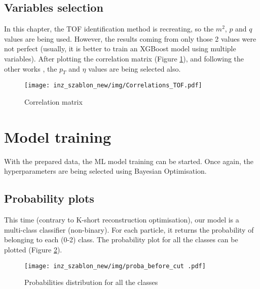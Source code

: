 \subsection{Variables selection}
In this chapter, the TOF identification method is recreating, so the $m^2$, $p$ and $q$ values are being used. However, the results coming from only those 2 values were not perfect (usually, it is better to train an XGBoost model using multiple variables). After plotting the correlation matrix (Figure \ref{cmatrix tof}), and following the other works \cite{ostrowski}, the $p_T$ and $\eta$ values are being selected also. 

\begin{figure}[h!]
    \centering
    \texttt{[image: inz\_szablon\_new/img/Correlations\_TOF.pdf]}
    \caption{Correlation matrix}
    \label{cmatrix tof}
\end{figure}

\section{Model training}
With the prepared data, the ML model training can be started. Once again, the hyperparameters are being selected using Bayesian Optimisation. 

\subsection{Probability plots}
This time (contrary to K-short reconstruction optimisation), our model is a multi-class classifier (non-binary). For each particle, it returns the probability of belonging to each (0-2) class. The probability plot for all the classes can be plotted (Figure \ref{proba all}).
\begin{figure}[H]
    \centering
    \texttt{[image: inz\_szablon\_new/img/proba\_before\_cut .pdf]}
    \caption{Probabilities distribution for all the classes}
    \label{proba all}
\end{figure}

